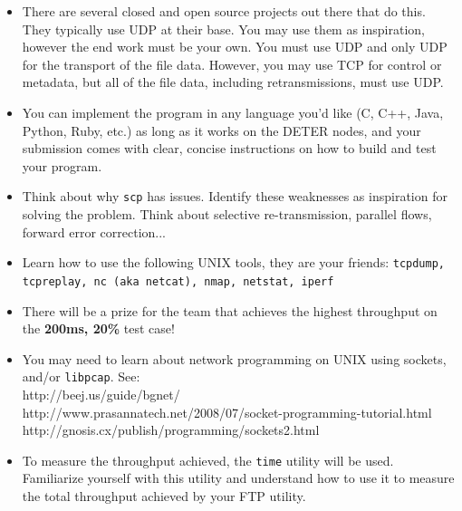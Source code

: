 \documentclass[10pt]{article}
\begin{document}
\begin{itemize}
\itemsep0em
\item There are several closed and open source projects out there that do this. They typically use UDP at their base. You may use them as inspiration, however the end work must be your own. You must use UDP and only UDP for the transport of the file data. However, you may use TCP for control or metadata, but all of the file data, including retransmissions, must use UDP.
\item You can implement the program in any language you'd like (C, C++, Java, Python, Ruby, etc.) as long as it works on the DETER nodes, and your submission comes with clear, concise instructions on how to build and test your program.
\item Think about why \texttt{scp} has issues. Identify these weaknesses as inspiration for solving the problem. Think about selective re-transmission, parallel flows, forward error correction...
\item Learn how to use the following UNIX tools, they are your friends: \texttt{tcpdump, tcpreplay, nc (aka netcat), nmap, netstat, iperf}
\item There will be a prize for the team that achieves the highest throughput on the \textbf{200ms, 20\%} test case!
\item You may need to learn about network programming on UNIX using sockets, and/or \texttt{libpcap}. See: \\
http://beej.us/guide/bgnet/\\
http://www.prasannatech.net/2008/07/socket-programming-tutorial.html\\
http://gnosis.cx/publish/programming/sockets2.html
\item To measure the throughput achieved, the \texttt{time} utility will be used. Familiarize yourself with this utility and understand how to use it to measure the total throughput achieved by your FTP utility.
\end{itemize}
\end{document}
